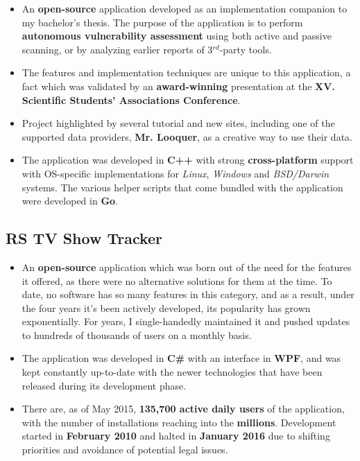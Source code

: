 \documentclass[11pt,a4paper,sans]{moderncv}
\begin{document}
	\begin{itemize}
		\item An \textbf{open-source} application developed as an implementation companion to my bachelor's thesis. The purpose of the application is to perform \textbf{autonomous vulnerability assessment} using both active and passive scanning, or by analyzing earlier reports of 3$^{rd}$-party tools.

		\item The features and implementation techniques are unique to this application, a fact which was validated by an \textbf{award-winning} presentation at the \textbf{XV. Scientific Students' Associations Conference}.

		\item Project highlighted by several tutorial and new sites, including one of the supported data providers, \textbf{Mr. Looquer}, as a creative way to use their data.

		\item The application was developed in \textbf{C++} with strong \textbf{cross-platform} support with OS-specific implementations for \textit{Linux}, \textit{Windows} and \textit{BSD/Darwin} systems. The various helper scripts that come bundled with the application were developed in \textbf{Go}.
	\end{itemize}

	\subsection{RS TV Show Tracker}

	\begin{itemize}
		\item An \textbf{open-source} application which was born out of the need for the features it offered, as there were no alternative solutions for them at the time. To date, no software has so many features in this category, and as a result, under the four years it's been actively developed, its popularity has grown exponentially. For years, I single-handedly maintained it and pushed updates to hundreds of thousands of users on a monthly basis.

		\item The application was developed in \textbf{C\#} with an interface in \textbf{WPF}, and was kept constantly up-to-date with the newer technologies that have been released during its development phase.

		\item There are, as of May 2015, \textbf{135,700 active daily users} of the application, with the number of installations reaching into the \textbf{millions}. Development started in \textbf{February 2010} and halted in \textbf{January 2016} due to shifting priorities and avoidance of potential legal issues.
	\end{itemize}
\end{document}
